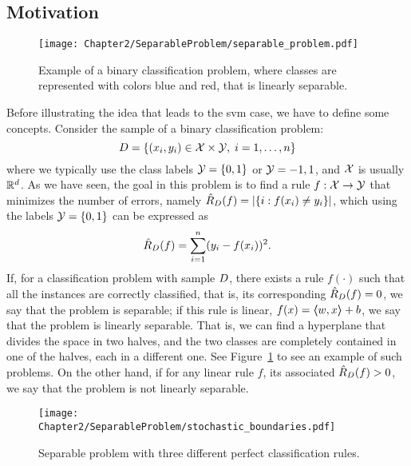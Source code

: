 \subsection{Motivation}
%
\begin{figure}[t!]
    \centering
    \texttt{[image: Chapter2/SeparableProblem/separable\_problem.pdf]}
    \caption{Example of a binary classification problem, where classes are represented with colors blue and red, that is linearly separable.}
    \label{fig:separable_problem}
\end{figure}
Before illustrating the idea that leads to the \acrshort{svm} case, we have to define some concepts. Consider the sample of a binary classification problem:
\begin{equation}
    \nonumber
    D = \left\{(x_i, y_i) \in \mathcal{X} \times \mathcal{Y}, \; i=1, \ldots, n\right\}
\end{equation}
where we typically use the class labels $\mathcal{Y} = \left\{0, 1\right\}$ or $\mathcal{Y}={-1, 1}$, and $\mathcal{X}$ is usually $\mathbb{R}^d$. As we have seen, the goal in this problem is to find a rule $f: \mathcal{X} \to \mathcal{Y}$ that minimizes the number of errors, namely $\hat{R}_D(f) = \left|\left\{i: f(x_i) \neq y_i\right\}\right|$, which using the labels $\mathcal{Y} = \left\{0, 1\right\}$ can be expressed as
\begin{equation}
    \nonumber
    \hat{R}_D(f) = \sum_{i=1}^n (y_i - f(x_i))^2 .
\end{equation}
If, for a classification problem with sample $D$, there exists a rule $f(\cdot)$ such that all the instances are correctly classified, that is, its corresponding $\hat{R}_D(f) = 0$, we say that the problem is separable; if this rule is linear, $f(x) = \bm{\left\langle} w, x \bm{\right\rangle} + b$, we say that the problem is linearly separable. That is, we can find a hyperplane that divides the space in two halves, and the two classes are completely contained in one of the halves, each in a different one. See Figure~\ref{fig:separable_problem} to see an example of such problems.
On the other hand, if for any linear rule $f$, its associated $\hat{R}_D(f) > 0$, we say that the problem is not linearly separable. 
%
\begin{figure}[t!]
    \centering
    \texttt{[image: Chapter2/SeparableProblem/stochastic\_boundaries.pdf]}
    \caption{Separable problem with three different perfect classification rules.}
    \label{fig:stochastic_boundaries}
\end{figure}

